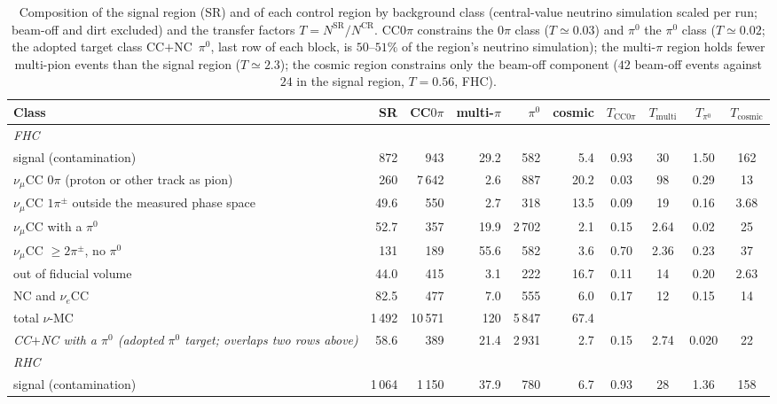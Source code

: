 \documentclass[11pt,a4paper]{article}
\begin{document}
\begin{table}[H]
  \centering
  \caption{Composition of the signal region (SR) and of each control region by background class
    (central-value neutrino simulation scaled per run; beam-off and dirt excluded) and the transfer
    factors $T=N^{\mathrm{SR}}/N^{\mathrm{CR}}$. CC$0\pi$ constrains the $0\pi$ class ($T\simeq0.03$) and
    $\pi^0$ the $\pi^0$ class ($T\simeq0.02$; the adopted target class CC$+$NC~$\pi^0$, last row of each
    block, is $50$--$51\%$ of the region's neutrino simulation); the multi-$\pi$ region holds fewer
    multi-pion events than the signal region ($T\simeq2.3$); the cosmic region constrains only the
    beam-off component ($42$ beam-off events against $24$ in the signal region, $T=0.56$, FHC).}
  \label{tab:cr_transfer}
  \scriptsize
  \begin{tabular}{@{}p{4.2cm}rrrrrcccc@{}}
    \toprule
    Class & SR & CC$0\pi$ & multi-$\pi$ & $\pi^0$ & cosmic & $T_{\mathrm{CC}0\pi}$ & $T_{\mathrm{multi}}$ & $T_{\pi^0}$ & $T_{\mathrm{cosmic}}$ \\
    \midrule
    \multicolumn{10}{l}{\emph{FHC}} \\
    signal (contamination) & 872 & 943 & 29.2 & 582 & 5.4 & 0.93 & 30 & 1.50 & 162 \\
    $\nu_\mu$CC $0\pi$ (proton or other track as pion) & 260 & 7\,642 & 2.6 & 887 & 20.2 & 0.03 & 98 & 0.29 & 13 \\
    $\nu_\mu$CC $1\pi^\pm$ outside the measured phase space & 49.6 & 550 & 2.7 & 318 & 13.5 & 0.09 & 19 & 0.16 & 3.68 \\
    $\nu_\mu$CC with a $\pi^0$ & 52.7 & 357 & 19.9 & 2\,702 & 2.1 & 0.15 & 2.64 & 0.02 & 25 \\
    $\nu_\mu$CC $\geq2\pi^\pm$, no $\pi^0$ & 131 & 189 & 55.6 & 582 & 3.6 & 0.70 & 2.36 & 0.23 & 37 \\
    out of fiducial volume & 44.0 & 415 & 3.1 & 222 & 16.7 & 0.11 & 14 & 0.20 & 2.63 \\
    NC and $\nu_e$CC & 82.5 & 477 & 7.0 & 555 & 6.0 & 0.17 & 12 & 0.15 & 14 \\
    total $\nu$-MC & 1\,492 & 10\,571 & 120 & 5\,847 & 67.4 & & & & \\
    \emph{CC$+$NC with a $\pi^0$ (adopted $\pi^0$ target; overlaps two rows above)} & 58.6 & 389 & 21.4 & 2\,931 & 2.7 & 0.15 & 2.74 & 0.020 & 22 \\
    \midrule
    \multicolumn{10}{l}{\emph{RHC}} \\
    signal (contamination) & 1\,064 & 1\,150 & 37.9 & 780 & 6.7 & 0.93 & 28 & 1.36 & 158 \\

\end{tabular}
\end{table}
\end{document}
